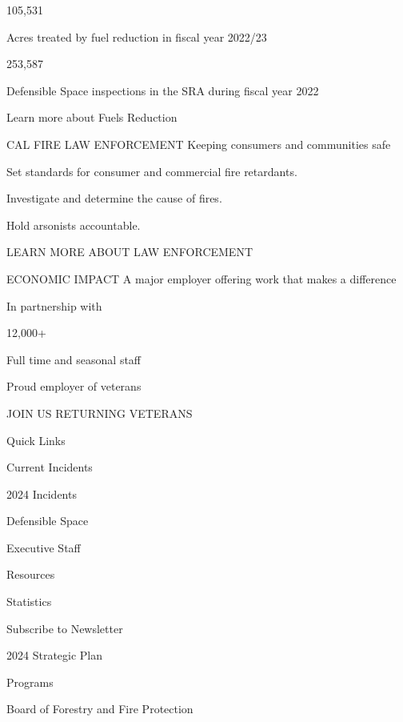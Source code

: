 \documentclass[a4paper,11pt]{article}
\begin{document}
\begin{docenv}
{ 


 105,531
 
Acres treated by fuel reduction in fiscal year 2022/23


 253,587
 
Defensible Space inspections in the SRA during fiscal year 2022

Learn more about Fuels Reduction

 

CAL FIRE LAW ENFORCEMENT
Keeping consumers and communities safe

Set standards for consumer and commercial fire retardants.

Investigate and determine the cause of fires.

Hold arsonists accountable.

LEARN MORE ABOUT LAW ENFORCEMENT

 

ECONOMIC IMPACT
A major employer offering work that makes a difference

In partnership with


 12,000+
 
Full time and seasonal staff

Proud employer of veterans

JOIN US
RETURNING VETERANS

Quick Links

Current Incidents

2024 Incidents

Defensible Space

Executive Staff

Resources

Statistics

Subscribe to Newsletter

2024 Strategic Plan

Programs

Board of Forestry and Fire Protection}
\end{docenv}
\end{document}
